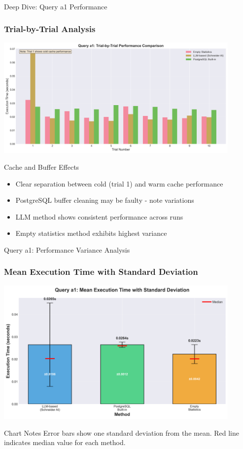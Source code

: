\documentclass[smaller]{beamer}
\begin{document}
\begin{frame}{Deep Dive: Query a1 Performance}
\frametitle{Trial-by-Trial Analysis}

\begin{center}
\includegraphics[width=0.9\textwidth]{images/a1_trial_comparison.png}
\end{center}

\begin{alertblock}{Cache and Buffer Effects}
\begin{itemize}
    \item Clear separation between cold (trial 1) and warm cache performance
    \item PostgreSQL buffer cleaning may be faulty - note variations
    \item LLM method shows consistent performance across runs
    \item Empty statistics method exhibits highest variance
\end{itemize}
\end{alertblock}

\end{frame}

\begin{frame}{Query a1: Performance Variance Analysis}
\frametitle{Mean Execution Time with Standard Deviation}

\begin{center}
\includegraphics[width=0.9\textwidth]{images/a1_execution_time_barplot.png}
\end{center}

\begin{alertblock}{Chart Notes}
Error bars show one standard deviation from the mean. Red line indicates median value for each method.
\end{alertblock}

\end{frame}
\end{document}
